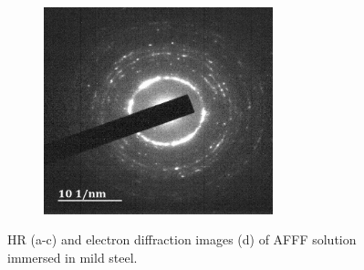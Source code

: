 \documentclass[12pt]{report}
\begin{document}
\begin{figure}[H]
\hspace{-1em}
\begin{subfigure}{.45\textwidth}
    \includegraphics[height=6cm, width=\textwidth]{afff_solution_immersed_in_mild_steel.png}
\end{subfigure}

\caption{HR (a-c) and electron diffraction images (d) of AFFF solution immersed in mild steel.}
\label{ch5:figure:mild_steel_images}
\end{figure}
\end{document}
